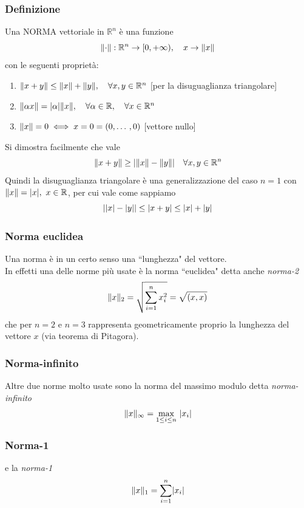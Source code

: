 \documentclass[12pt,a4paper]{article}
\DeclarePairedDelimiter{\abs}{\lvert}{\rvert}
\DeclarePairedDelimiter{\norma}{\lVert}{\rVert}
\begin{document}
\subsubsection{Definizione}
Una NORMA vettoriale in $\mathbb{R}^n$ è una funzione
\[
\norma{\cdot} : \mathbb{R}^n \to [ 0, + \infty ), \quad x \to \norma{x}
\]
con le seguenti proprietà:
\begin{enumerate}
    \item $\norma{x+y} \le \norma{x} + \norma{y}, \quad \forall x,y \in \mathbb{R}^n$ [per la disuguaglianza triangolare]
    
    \item $\norma{\alpha x} = \abs{\alpha} \norma{x}, \quad \forall \alpha \in \mathbb{R}, \quad \forall x \in \mathbb{R}^n$
    
    \item $\norma{x} = 0 \iff x = 0 = (0, \dotso , 0)$ [vettore nullo]
\end{enumerate}
Si dimostra facilmente che vale
\[
\norma{x+y} \ge \abs{\norma{x} - \norma{y}} \quad \forall x, y \in \mathbb{R}^n
\]
Quindi la disuguaglianza triangolare è una generalizzazione del caso $n=1$ con $\norma{x} = \abs{x}, \ x \in \mathbb{R}$, per cui vale come sappiamo
\[
\abs{\abs{x} - \abs{y}} \le \abs{x+y} \le \abs{x} + \abs{y}
\]

\subsubsection{Norma euclidea}
Una norma è in un certo senso una ``lunghezza" del vettore.\\
In effetti una delle norme più usate è la norma ``euclidea" detta anche \textit{norma-2}
\[
\norma{x}_2 = \sqrt{\sum_{i=1}^n x_i^2} = \sqrt{(x,x)}
\]
che per $n=2$ e $n=3$ rappresenta geometricamente proprio la lunghezza del vettore $x$ (via teorema di Pitagora).\\

\subsubsection{Norma-infinito}
Altre due norme molto usate sono la norma del massimo modulo detta \textit{norma-infinito}
\[
\norma{x}_\infty = \underset{1 \le i \le n}{\text{max}} \ \abs{x_i}
\]

\subsubsection{Norma-1}
e la \textit{norma-1}
\[
\norma{x}_1 = \sum_{i=1}^n \abs{x_i}
\]
\end{document}
